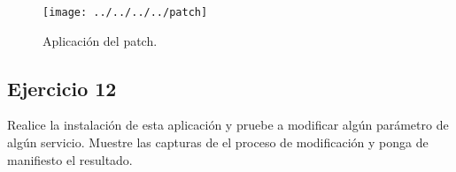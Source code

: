 \documentclass[a4paper, 11pt]{article} %
\begin{document}
\begin{figure}[htpb]
\texttt{[image: ../../../../patch]}
\caption{Aplicación del patch.}
\end{figure}


\subsection{Ejercicio 12}
Realice la instalación de esta aplicación y pruebe a modificar algún parámetro de algún servicio. Muestre las capturas de el proceso de modificación y ponga de manifiesto el resultado.
\end{document}
